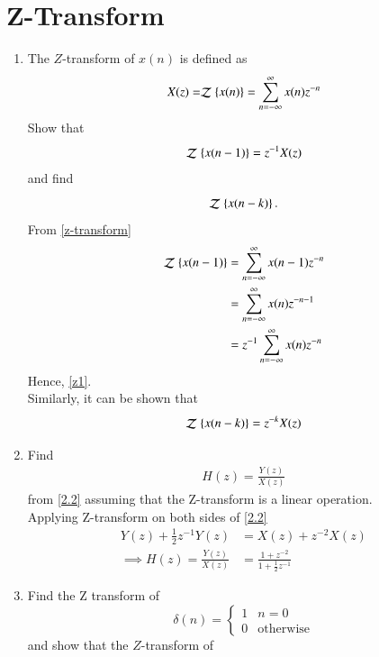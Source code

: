 \documentclass[journal,12pt,twocolumn]{IEEEtran}
\newcommand{\systemZ}[1]{\stackrel{#1}{\mathcal{Z}}}
\theoremstyle{remark}
\begin{document}
\section{Z-Transform}

\begin{enumerate}[label=\thesection.\arabic*]
\item The $Z$-transform of $x(n)$ is defined as
\begin{equation}
X(z)=\systemZ{}\cbrak{x(n)}=\sum _{n=-\infty }^{\infty }x(n)z^{-n} \label{z-transform}
\end{equation}
Show that
\begin{equation}
\systemZ{} \cbrak{x(n-1)} = z^{-1}X(z) \label{z1}
\end{equation}
and find
\begin{equation}
	\systemZ{} \cbrak{x(n-k)}.
\end{equation}
\solution 
From \eqref{z-transform}
\begin{align}
 \systemZ{} \cbrak{x(n-1)} &=\sum _{n=-\infty }^{\infty }x(n-1)z^{-n} \\
&=\sum _{n=-\infty }^{\infty }x(n)z^{-n-1} \\
&= z^{-1}\sum _{n=-\infty }^{\infty }x(n)z^{-n}
\end{align}
 Hence, \eqref{z1}.\\
 Similarly, it can be shown that
\begin{equation}
	\systemZ{} \cbrak{x(n-k)} = z^{-k}X(z) \label{3.1}
\end{equation}
\item Find
\begin{align}
H(z)=\frac{Y(z)}{X(z)}
\end{align}
from \eqref{2.2} assuming that the Z-transform is a linear operation.\\
\solution Applying Z-transform on both sides of \eqref{2.2}
\begin{align}
Y(z)+\frac{1}{2}z^{-1}Y(z) &= X(z)+z^{-2}X(z) \\
\implies H(z)= \frac{Y(z)}{X(z)}&=\frac{1+z^{-2}}{1+\frac{1}{2}z^{-1}} \label{3.2}
\end{align}
\item Find the Z transform of 
\begin{equation}
\delta(n)
=
\begin{cases}
1 & n = 0
\\
0 & \text{otherwise}
\end{cases}
\end{equation}
and show that the $Z$-transform of

\end{enumerate}
\end{document}
